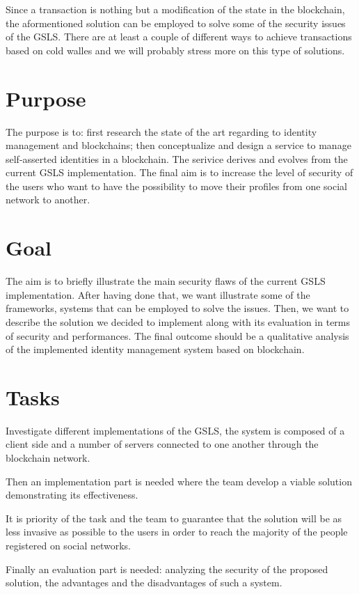 \documentclass[paper=a4, fontsize=11pt]{scrartcl} %
\numberwithin{equation}{section} %
\numberwithin{figure}{section} %
\numberwithin{table}{section} %
\begin{document}
Since a transaction is nothing but a modification of the state in the blockchain, the aformentioned solution can be employed to solve some of the security issues of the GSLS. There are at least a couple of different ways to achieve transactions based on cold walles \cite{icebox} \cite{light-wallet} and we will probably stress more on this type of solutions. 

\section{Purpose}
The purpose is to: first research the state of the art regarding to identity management and blockchains; then conceptualize and design a service to manage self-asserted identities in a blockchain. The serivice derives and evolves from the current GSLS implementation. The final aim is to increase the level of security of the users who want to have the possibility to move their profiles from one social network to another. 

\section{Goal}
The aim is to briefly illustrate the main security flaws of the current GSLS implementation. After having done that, we want illustrate some of the frameworks, systems that can be employed to solve the issues. Then, we want to describe the solution we decided to implement along with its evaluation in terms of security and performances. The final outcome should be a qualitative analysis of the implemented identity management system based on blockchain. 

\section{Tasks}

Investigate different implementations of the GSLS, the system is composed of a client side and a number of servers connected to one another through the blockchain network. 

Then an implementation part is needed where the team develop a viable solution demonstrating its effectiveness.

It is priority of the task and the team to guarantee that the solution will be as less invasive as possible to the users in order to reach the majority of the people registered on social networks.

Finally an evaluation part is needed: analyzing the security of the proposed solution, the advantages and the disadvantages of such a system.
\end{document}
